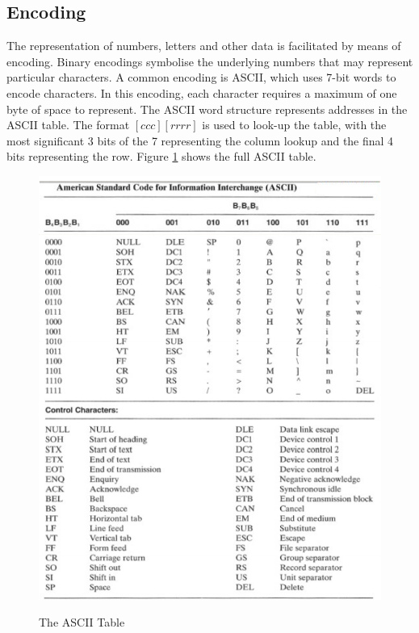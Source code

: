 \documentclass[10pt,a4paper]{article}
\begin{document}
\subsection{Encoding}
The representation of numbers, letters and other data is facilitated by means of encoding. Binary encodings symbolise the underlying numbers that may represent particular characters. A common encoding is ASCII, which uses 7-bit words to encode characters. In this encoding, each character requires a maximum of one byte of space to represent. The ASCII word structure represents addresses in the ASCII table. The format $[ccc][rrrr]$ is used to look-up the table, with the most significant 3 bits of the 7 representing the column lookup and the final 4 bits representing the row. Figure {\ref{ascii}} shows the full ASCII table. 
\begin{figure}
\caption{The ASCII Table\cite{LOGICDESIGN}}
\begin{center}
\includegraphics[scale=0.60]{../images/ascii.png}
\label{ascii}
\end{center}
\end{figure}
{}

\begin{center}
\end{center}
\end{document}
